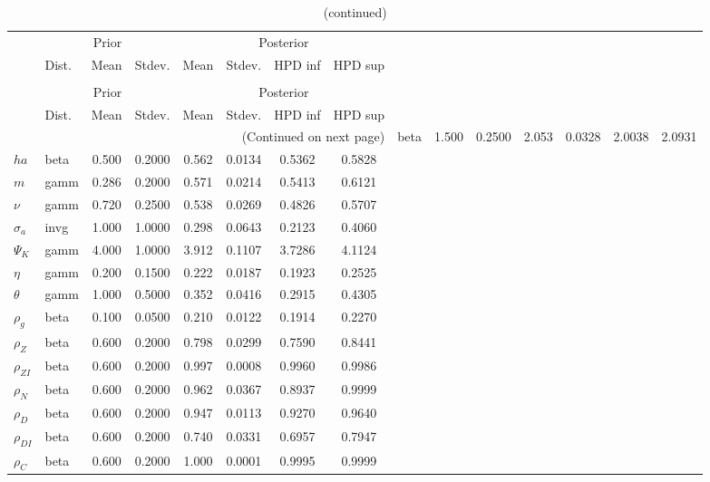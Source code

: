  
\begin{center}
\begin{longtable}{llcccccc} 
\caption{Results from Metropolis-Hastings (parameters)}
 \label{Table:MHPosterior:1}\\
\toprule 
  & \multicolumn{3}{c}{Prior}  &  \multicolumn{4}{c}{Posterior} \\
  \cmidrule(r{.75em}){2-4} \cmidrule(r{.75em}){5-8}
  & Dist. & Mean  & Stdev. & Mean & Stdev. & HPD inf & HPD sup\\
\midrule \endfirsthead 
\caption{(continued)}\\\toprule 
  & \multicolumn{3}{c}{Prior}  &  \multicolumn{4}{c}{Posterior} \\
  \cmidrule(r{.75em}){2-4} \cmidrule(r{.75em}){5-8}
  & Dist. & Mean  & Stdev. & Mean & Stdev. & HPD inf & HPD sup\\
\midrule \endhead 
\bottomrule \multicolumn{8}{r}{(Continued on next page)} \endfoot 
\bottomrule \endlastfoot 
${\gamma}$ & beta &   1.500 & 0.2500 &   2.053& 0.0328 &  2.0038 &  2.0931 \\ 
${ha}$ & beta &   0.500 & 0.2000 &   0.562& 0.0134 &  0.5362 &  0.5828 \\ 
${m}$ & gamm &   0.286 & 0.2000 &   0.571& 0.0214 &  0.5413 &  0.6121 \\ 
$\nu$ & gamm &   0.720 & 0.2500 &   0.538& 0.0269 &  0.4826 &  0.5707 \\ 
${\sigma_a}$ & invg &   1.000 & 1.0000 &   0.298& 0.0643 &  0.2123 &  0.4060 \\ 
${\Psi_K}$ & gamm &   4.000 & 1.0000 &   3.912& 0.1107 &  3.7286 &  4.1124 \\ 
${\eta}$ & gamm &   0.200 & 0.1500 &   0.222& 0.0187 &  0.1923 &  0.2525 \\ 
${\theta}$ & gamm &   1.000 & 0.5000 &   0.352& 0.0416 &  0.2915 &  0.4305 \\ 
${\rho_g}$ & beta &   0.100 & 0.0500 &   0.210& 0.0122 &  0.1914 &  0.2270 \\ 
${\rho_Z}$ & beta &   0.600 & 0.2000 &   0.798& 0.0299 &  0.7590 &  0.8441 \\ 
${\rho_{ZI}}$ & beta &   0.600 & 0.2000 &   0.997& 0.0008 &  0.9960 &  0.9986 \\ 
${\rho_N}$ & beta &   0.600 & 0.2000 &   0.962& 0.0367 &  0.8937 &  0.9999 \\ 
${\rho_D}$ & beta &   0.600 & 0.2000 &   0.947& 0.0113 &  0.9270 &  0.9640 \\ 
${\rho_{DI}}$ & beta &   0.600 & 0.2000 &   0.740& 0.0331 &  0.6957 &  0.7947 \\ 
${\rho_C}$ & beta &   0.600 & 0.2000 &   1.000& 0.0001 &  0.9995 &  0.9999 \\ 
\end{longtable}
 \end{center}
